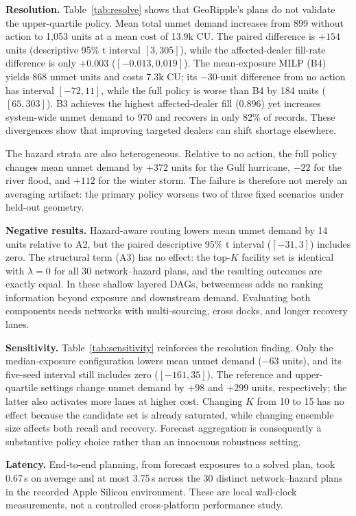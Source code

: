 \documentclass[conference]{IEEEtran}
\begin{document}
\textbf{Resolution.} Table~\ref{tab:resolve} shows that GeoRipple's plans
do not validate the upper-quartile policy. Mean total unmet demand increases
from 899 without action to 1{,}053 units at a mean cost of 13.9k CU. The
paired difference is $+154$ units (descriptive 95\% t interval $[3,305]$),
while the affected-dealer fill-rate difference is only $+0.003$
($[-0.013,0.019]$). The mean-exposure MILP (B4) yields 868 unmet units and
costs 7.3k CU; its $-30$-unit difference from no action has interval
$[-72,11]$, while the full policy is worse than B4 by 184 units
($[65,303]$). B3
achieves the highest affected-dealer fill (0.896) yet increases system-wide
unmet demand to 970 and recovers in only 82\% of records. These divergences
show that improving targeted dealers can shift shortage elsewhere.

The hazard strata are also heterogeneous. Relative to no action, the full
policy changes mean unmet demand by $+372$ units for the Gulf hurricane,
$-22$ for the river flood, and $+112$ for the winter storm. The failure is
therefore not merely an averaging artifact: the primary policy worsens two
of three fixed scenarios under held-out geometry.

\textbf{Negative results.} Hazard-aware routing lowers mean unmet demand
by 14 units relative to A2, but the paired descriptive 95\% t interval
($[-31,3]$) includes zero. The structural
term (A3) has no effect: the top-$K$ facility set is identical with
$\lambda=0$ for all 30 network--hazard plans, and the resulting outcomes
are exactly equal. In these shallow layered DAGs, betweenness adds no
ranking information beyond exposure and downstream demand.
Evaluating both components needs networks with multi-sourcing, cross
docks, and longer recovery lanes.



\textbf{Sensitivity.} Table~\ref{tab:sensitivity} reinforces the resolution
finding. Only the median-exposure configuration lowers mean unmet demand
($-63$ units), and its five-seed interval still includes zero
($[-161,35]$). The reference and upper-quartile settings change unmet demand
by $+98$ and $+299$ units, respectively; the latter also activates more
lanes at higher cost. Changing $K$ from 10 to 15 has no effect because the
candidate set is already saturated, while changing ensemble size affects
both recall and recovery. Forecast aggregation is consequently a substantive
policy choice rather than an innocuous robustness setting.

\textbf{Latency.} End-to-end planning, from forecast exposures to a
solved plan, took 0.67\,s on average and at most 3.75\,s across the 30
distinct network--hazard plans in the recorded Apple Silicon environment.
These are local wall-clock measurements, not
a controlled cross-platform performance study.
\end{document}
